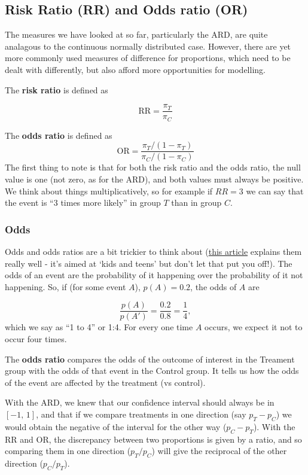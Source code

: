 \documentclass[
  openany]{book}
\theoremstyle{definition}
\theoremstyle{definition}
\theoremstyle{definition}
\theoremstyle{definition}
\theoremstyle{remark}
\begin{document}
\subsection{Risk Ratio (RR) and Odds ratio (OR)}\label{risk-ratio-rr-and-odds-ratio-or}

The measures we have looked at so far, particularly the ARD, are quite analagous to the continuous normally distributed case. However, there are yet more commonly used measures of difference for proportions, which need to be dealt with differently, but also afford more opportunities for modelling.

The \textbf{risk ratio} is defined as

\[\text{RR} = \frac{\pi_T}{\pi_C}\]

The \textbf{odds ratio} is defined as
\[\text{OR} = \frac{\pi_T/\left(1-\pi_T\right)}{\pi_C/\left(1-\pi_C\right)}\]
The first thing to note is that for both the risk ratio and the odds ratio, the null value is one (not zero, as for the ARD), and both values must always be positive. We think about things multiplicatively, so for example if \(RR=3\) we can say that the event is ``3 times more likely'' in group \(T\) than in group \(C\).

\subsubsection*{Odds}\label{odds}

Odds and odds ratios are a bit trickier to think about (\href{https://kids.frontiersin.org/articles/10.3389/frym.2022.926624\#:~:text=As\%20an\%20example\%2C\%20if\%20the,disease\%20if\%20you\%20are\%20exposed.}{this article} explains them really well - it's aimed at `kids and teens' but don't let that put you off!). The odds of an event are the probability of it happening over the probability of it not happening. So, if (for some event \(A\)), \(p\left(A\right)=0.2\), the odds of \(A\) are

\[\frac{p\left(A\right)}{p\left(A'\right)} = \frac{0.2}{0.8} = \frac{1}{4}, \]
which we say as ``1 to 4'' or 1:4. For every one time \(A\) occurs, we expect it not to occur four times.

The \textbf{odds ratio} compares the odds of the outcome of interest in the Treament group with the odds of that event in the Control group. It tells us how the odds of the event are affected by the treatment (vs control).

With the ARD, we knew that our confidence interval should always be in \(\left[-1,\,1\right]\), and that if we compare treatments in one direction (say \(p_T - p_C\)) we would obtain the negative of the interval for the other way (\(p_C - p_T\)). With the RR and OR, the discrepancy between two proportions is given by a ratio, and so comparing them in one direction (\(p_T / p_C\)) will give the reciprocal of the other direction (\(p_C / p_T\)).
\end{document}

